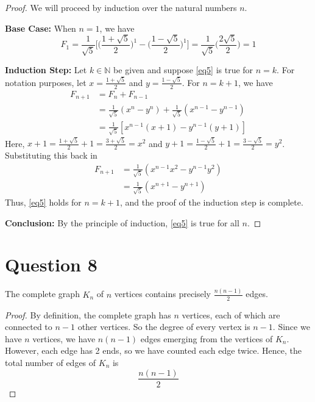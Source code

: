 \documentclass[11pt, oneside]{article}   	%
\begin{document}
\begin{proof}
We will proceed by induction over the natural numbers $n$. 

\textbf{Base Case:} When $n=1$, we have
$$F_1 = \frac{1}{\sqrt{5}} \Big[\Big(\frac{1+\sqrt{5}}{2}\Big)^1 - \Big(\frac{1-\sqrt{5}}{2}\Big)^1 \Big] = \frac{1}{\sqrt{5}} \Big(\frac{2\sqrt{5}}{2}\Big) = 1$$

\textbf{Induction Step:} Let $k \in \mathbb{N}$ be given and suppose \eqref{eq5} is true for $n=k$. For notation purposes, let $x=\frac{1+\sqrt{5}}{2}$ and $y= \frac{1-\sqrt{5}}{2}$. For $n=k+1$, we have
\begin{align*}
	F_{n+1} & = F_n + F_{n-1} \\
	& = \frac{1}{\sqrt{5}} (x^n-y^n) + \frac{1}{\sqrt{5}} (x^{n-1} - y^{n-1}) \\
	& = \frac{1}{\sqrt{5}} [x^{n-1}(x+1) - y^{n-1}(y+1)]
\end{align*}
Here, $x+1 = \frac{1+\sqrt{5}}{2} +1 = \frac{3+ \sqrt{5}}{2} = x^2$ and $y+1 = \frac{1-\sqrt{5}}{2} +1 = \frac{3- \sqrt{5}}{2} = y^2$. Substituting this back in
\begin{align*}
	F_{n+1} & = \frac{1}{\sqrt{5}} (x^{n-1}x^2 - y^{n-1}y^2) \\
	& = \frac{1}{\sqrt{5}} (x^{n+1} - y^{n+1}) 
\end{align*}
Thus, \eqref{eq5} holds for $n=k+1$, and the proof of the induction step is complete.

\textbf{Conclusion:} By the principle of induction, \eqref{eq5} is true for all $n$.
\end{proof}


\section*{Question 8}

The complete graph $K_n$ of $n$ vertices contains precisely $\frac{n(n-1)}{2}$ edges.
\begin{proof}
By definition, the complete graph has $n$ vertices, each of which are connected to $n-1$ other vertices. So the degree of every vertex is $n-1$. Since we have $n$ vertices, we have $n(n-1)$ edges emerging from the vertices of $K_n$. However, each edge has 2 ends, so we have counted each edge twice. Hence, the total number of edges of $K_n$ is
$$\frac{n(n-1)}{2}$$
\end{proof}
\end{document}
